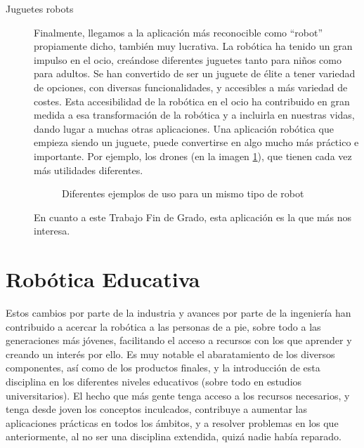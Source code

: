 \begin{description}
	\item [Juguetes robots] Finalmente, llegamos a la aplicación más reconocible como ``robot'' propiamente dicho, también muy lucrativa. La robótica ha tenido un gran impulso en el ocio, creándose diferentes juguetes tanto para niños como para adultos. Se han convertido de ser un juguete de élite a tener variedad de opciones, con diversas funcionalidades, y accesibles a más variedad de costes. Esta accesibilidad de la robótica en el ocio ha contribuido en gran medida a esa transformación de la robótica y a incluirla en nuestras vidas, dando lugar a muchas otras aplicaciones. Una aplicación robótica que empieza siendo un juguete, puede convertirse en algo mucho más práctico e importante. Por ejemplo, los drones (en la imagen \ref{img:drones}), que tienen cada vez más utilidades diferentes.
	
	\begin{figure}[h]
		\centering
		\begin{subfigure}
			[Drone teledirigido orientado al ocio grabando deporte] {
				\texttt{[image: droneski.jpg]}
				\label{img:drone1}}
		\end{subfigure}
		\begin{subfigure}
			[Drone de ayuda humanitaria] {
				\texttt{[image: dronerescate.jpg]}
				\label{img:drone2}}
		\end{subfigure}
		\caption{Diferentes ejemplos de uso para un mismo tipo de robot}
		\label{img:drones}
	\end{figure}
	
	
	En cuanto a este Trabajo Fin de Grado, esta aplicación es la que más nos interesa.
\end{description}

\section{Robótica Educativa}


Estos cambios por parte de la industria y avances por parte de la ingeniería han contribuido a acercar la robótica a las personas de a pie, sobre todo a las generaciones más jóvenes, facilitando el acceso a recursos con los que aprender y creando un interés por ello. Es muy notable el abaratamiento de los diversos componentes, así como de los productos finales, y la introducción de esta disciplina en los diferentes niveles educativos (sobre todo en estudios universitarios). El hecho que más gente tenga acceso a los recursos necesarios, y tenga desde joven los conceptos inculcados, contribuye a aumentar las aplicaciones prácticas en todos los ámbitos, y a resolver problemas en los que anteriormente, al no ser una disciplina extendida, quizá nadie había reparado. \\


